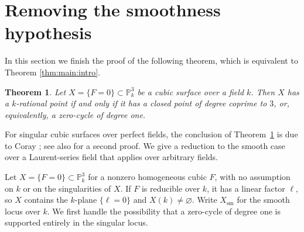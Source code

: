 \documentclass[a4paper,11pt]{amsart}
\numberwithin{equation}{section}
\newtheorem{theorem}{Theorem}[section]
\theoremstyle{definition}
\theoremstyle{remark}
\newcommand{\PP}{\mathbb P}
\begin{document}
\section{Removing the smoothness hypothesis}\label{sec:arbitrary}

In this section we finish the proof of the following theorem, which is equivalent to Theorem \ref{thm:main:intro}.

\begin{theorem}\label{thm:main}
Let $X=\{F=0\}\subset\PP^3_k$ be a cubic surface over a field $k$.
Then $X$ has a $k$-rational point if and only if it has a closed point of degree coprime to $3$, or, equivalently, a zero-cycle of degree one.
\end{theorem}

For singular cubic surfaces over perfect fields, the conclusion of
Theorem~\ref{thm:main} is due to Coray
\cite[Proposition~8.2]{coray}; see also
\cite[Corollary~1]{CoraySingular} for a second proof. We give a
reduction to the smooth case over a Laurent-series field that applies
over arbitrary fields.  

Let $X=\{F=0\}\subset\PP^3_k$ for a nonzero homogeneous cubic $F$,
with no assumption on $k$ or on the singularities of $X$. If $F$ is
reducible over $k$, it has a linear factor $\ell$, so $X$ contains
the $k$-plane $\{\ell=0\}$ and $X(k)\ne\varnothing$. Write
$X_{\mathrm{sm}}$ for the smooth locus over $k$. We first handle the
possibility that a zero-cycle of degree one is supported entirely in
the singular locus.
\end{document}
